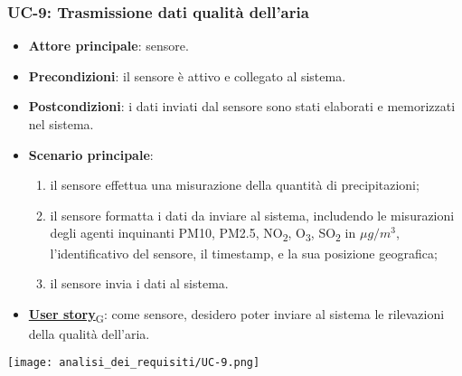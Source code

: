 \subsubsection{UC-9: Trasmissione dati qualità dell'aria}
\begin{itemize}
	\item \textbf{Attore principale}: sensore.
	\item \textbf{Precondizioni}: il sensore è attivo e collegato al sistema.
	\item \textbf{Postcondizioni}: i dati inviati dal sensore sono stati elaborati e memorizzati nel sistema.
	\item \textbf{Scenario principale}:
	      \begin{enumerate}
		      \item il sensore effettua una misurazione della quantità di precipitazioni;
		      \item il sensore formatta i dati da inviare al sistema, includendo le misurazioni degli agenti inquinanti PM10, PM2.5, NO\textsubscript{2}, O\textsubscript{3}, SO\textsubscript{2}
		            in $\mu g/m^3$, l'identificativo del sensore, il timestamp, e la sua posizione geografica;
		      \item il sensore invia i dati al sistema.
	      \end{enumerate}
	\item \href{https://7last.github.io/docs/pb/documentazione-interna/glossario\#user-story}{\textbf{User story}\textsubscript{G}}:
	      come sensore, desidero poter inviare al sistema le rilevazioni della qualità dell'aria.
\end{itemize}

\begin{center}
	\texttt{[image: analisi\_dei\_requisiti/UC-9.png]}
\end{center}

